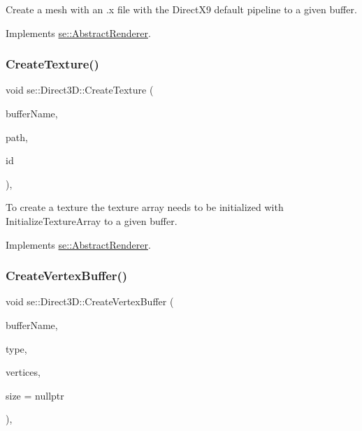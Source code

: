 Create a mesh with an .x file with the Direct\+X9 default pipeline to a given buffer. 

Implements \mbox{\hyperlink{classse_1_1_abstract_renderer_a4a3e8836f7a8b1b35a5f7cb1b4231476}{se\+::\+Abstract\+Renderer}}.

\mbox{\label{classse_1_1_direct3_d_a33c350a77a959847d3571e14feb72c85}} 
\subsubsection{\texorpdfstring{Create\+Texture()}{CreateTexture()}}
{\footnotesize\ttfamily void se\+::\+Direct3\+D\+::\+Create\+Texture (\begin{DoxyParamCaption}\item[{const std\+::string \&}]{buffer\+Name,  }\item[{const std\+::string \&}]{path,  }\item[{int}]{id }\end{DoxyParamCaption})\hspace{0.3cm}{\ttfamily [override]}, {\ttfamily [virtual]}}

To create a texture the texture array needs to be initialized with Initialize\+Texture\+Array to a given buffer. 

Implements \mbox{\hyperlink{classse_1_1_abstract_renderer_a89f2efd2ee68cfb6735e51ce87206dfd}{se\+::\+Abstract\+Renderer}}.

\mbox{\label{classse_1_1_direct3_d_a52e0bbf13e8045dab39bb2ef34028a94}} 
\subsubsection{\texorpdfstring{Create\+Vertex\+Buffer()}{CreateVertexBuffer()}}
{\footnotesize\ttfamily void se\+::\+Direct3\+D\+::\+Create\+Vertex\+Buffer (\begin{DoxyParamCaption}\item[{const std\+::string \&}]{buffer\+Name,  }\item[{\mbox{\hyperlink{namespacese_a9ed62241331cac830c5c1ba8450afc2b}{Render\+Type}}}]{type,  }\item[{\mbox{\hyperlink{structse_1_1_vertex}{Vertex}} $\ast$}]{vertices,  }\item[{\mbox{\hyperlink{namespacese_ada11715de7cf6e87b5dfb4611fe68d29}{Vector3i}} $\ast$}]{size = {\ttfamily nullptr} }\end{DoxyParamCaption})\hspace{0.3cm}{\ttfamily [override]}, {\ttfamily [virtual]}}

